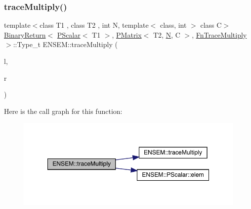 \subsubsection{\texorpdfstring{traceMultiply()}{traceMultiply()}\hspace{0.1cm}{\footnotesize\ttfamily [3/3]}}
{\footnotesize\ttfamily template$<$class T1 , class T2 , int N, template$<$ class, int $>$ class C$>$ \\
\mbox{\hyperlink{structENSEM_1_1BinaryReturn}{Binary\+Return}}$<$ \mbox{\hyperlink{classENSEM_1_1PScalar}{P\+Scalar}}$<$ T1 $>$, \mbox{\hyperlink{classENSEM_1_1PMatrix}{P\+Matrix}}$<$ T2, \mbox{\hyperlink{operator__name__util_8cc_a7722c8ecbb62d99aee7ce68b1752f337}{N}}, C $>$, \mbox{\hyperlink{structENSEM_1_1FnTraceMultiply}{Fn\+Trace\+Multiply}} $>$\+::Type\+\_\+t E\+N\+S\+E\+M\+::trace\+Multiply (\begin{DoxyParamCaption}\item[{const \mbox{\hyperlink{classENSEM_1_1PScalar}{P\+Scalar}}$<$ T1 $>$ \&}]{l,  }\item[{const \mbox{\hyperlink{classENSEM_1_1PMatrix}{P\+Matrix}}$<$ T2, \mbox{\hyperlink{operator__name__util_8cc_a7722c8ecbb62d99aee7ce68b1752f337}{N}}, C $>$ \&}]{r }\end{DoxyParamCaption})\hspace{0.3cm}{\ttfamily [inline]}}

Here is the call graph for this function\+:\nopagebreak
\begin{figure}[H]
\begin{center}
\leavevmode
\includegraphics[width=349pt]{df/d0a/group__primmatrix_ga5b0cf4c87cad1bfd7dcad0a42d0b4ae6_cgraph}
\end{center}
\end{figure}
\mbox{\label{group__primmatrix_gaaf91f3c1c18cadfc208acd80fd80ab0b}} 
